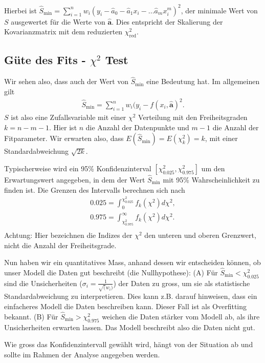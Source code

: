 Hierbei ist $\hat{S}_\text{min} = \sum_{i=1}^n w_i ( y_i - \hat{a}_0 - \hat{a}_1 x_i - ... \hat{a}_m x_i^m)^2$, der minimale Wert von $S$ ausgewertet f\"ur die Werte von $\boldsymbol{\hat{a}}$. Dies entspricht der Skalierung der Kovarianzmatrix mit dem reduzierten $\chi^2_\mathrm{red}$. 

\subsection{Güte des Fits - $\chi^2$ Test}
\label{subsec:vl8-5-1}

Wir sehen also, dass auch der Wert von $\hat{S}_\text{min}$ eine Bedeutung hat. Im allgemeinen gilt
\begin{align}
\hat{S}_\text{min} = \sum_{i=1}^n w_i ( y_i - f(x_i, \boldsymbol{\hat{a}})^2.
\end{align}
$S$ ist also eine Zufallsvariable mit einer $\chi^2$ Verteilung mit den Freiheitsgraden $k = n-m-1$. Hier ist $n$ die Anzahl der Datenpunkte und $m-1$ die Anzahl der Fitparameter. Wir erwarten also, dass $E(\hat{S}_\text{min}) = E(\chi^2_k) = k$, mit einer Standardabweichung $\sqrt{2k}$.

Typischerweise wird ein 95\% Konfidenzinterval $\left[\chi^2_{0.025}, \chi^2_{0.975} \right]$ um den Erwartungswert angegeben, in dem der Wert $\hat{S}_\text{min}$ mit 95\% Wahrscheinlichkeit zu finden ist.
Die Grenzen des Intervalls berechnen sich nach
\begin{align}
0.025 = \int_0^{\chi^2_{0.025}} f_k(\chi^2)d\chi^2,\\
0.975 = \int_{\chi^2_{0.975}}^\infty f_k(\chi^2)d\chi^2.\\
\end{align}
Achtung: Hier bezeichnen die Indizes der $\chi^2$ den unteren und oberen Grenzwert, nicht die Anzahl der Freiheitsgrade.

Nun haben wir ein quantitatives Mass, anhand dessen wir entscheiden können, ob unser Modell die Daten gut beschreibt (die Nullhypothese): (A) Für $\hat{S}_\text{min} < \chi^2_{0.025}$ sind die Unsicherheiten ($\sigma_i = \frac{1}{\sqrt(w_i)}$) der Daten zu gross, um sie als statistische Standardabweichung zu interpretieren. Dies kann z.B. darauf hinweisen, dass ein einfacheres Modell die Daten beschreiben kann. Dieser Fall ist als Overfitting bekannt. (B) Für $\hat{S}_\text{min} > \chi^2_{0.975}$ weichen die Daten stärker vom Modell ab, als ihre Unsicherheiten erwarten lassen. Das Modell beschreibt also die Daten nicht gut.

Wie gross das Konfidenzintervall gewählt wird, hängt von der Situation ab und sollte im Rahmen der Analyse angegeben werden.



